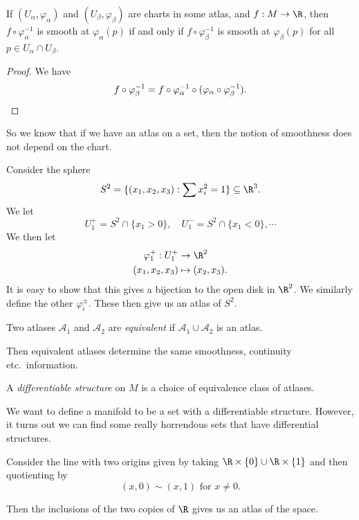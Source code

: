 \documentclass[a4paper]{article}
\begin{document}
\begin{lemma}
  If $(U_\alpha, \varphi_\alpha)$ and $(U_\beta, \varphi_\beta)$ are charts in some atlas, and $f: M \to \R$, then $f \circ \varphi_\alpha^{-1}$ is smooth at $\varphi_\alpha(p)$ if and only if $f \circ \varphi_\beta^{-1}$ is smooth at $\varphi_\beta (p)$ for all $p \in U_\alpha \cap U_\beta$.
\end{lemma}

\begin{proof}
  We have
  \[
    f \circ \varphi_\beta^{-1} = f \circ \varphi_\alpha^{-1} \circ (\varphi_\alpha \circ \varphi_\beta^{-1}). \qedhere
  \]
\end{proof}
So we know that if we have an atlas on a set, then the notion of smoothness does not depend on the chart.

\begin{eg}
  Consider the sphere
  \[
    S^2 = \{(x_1, x_2, x_3): \sum x_i^2 = 1\} \subseteq \R^3.
  \]
  We let
  \[
    U_1^+ = S^2 \cap \{x_1 > 0\},\quad U_1^- = S^2 \cap \{x_1 < 0\}, \cdots
  \]
  We then let
  \begin{align*}
    \varphi_1^+: U_1^+ &\to \R^2\\
    (x_1, x_2, x_3) &\mapsto (x_2, x_3).
  \end{align*}
  It is easy to show that this gives a bijection to the open disk in $\R^2$. We similarly define the other $\varphi_i^{\pm}$. These then give us an atlas of $S^2$.
\end{eg}

\begin{defi}
  Two atlases $\mathcal{A}_1$ and $\mathcal{A}_2$ are \emph{equivalent} if $\mathcal{A}_1 \cup \mathcal{A}_2$ is an atlas.
\end{defi}
Then equivalent atlases determine the same smoothness, continuity etc.\ information.

\begin{defi}
  A \emph{differentiable structure} on $M$ is a choice of equivalence class of atlases.
\end{defi}

We want to define a manifold to be a set with a differentiable structure. However, it turns out we can find some really horrendous sets that have differential structures.

\begin{eg}
  Consider the line with two origins given by taking $\R \times \{0\} \cup \R \times \{1\}$ and then quotienting by
  \[
    (x, 0) \sim (x, 1)\text{ for } x \not= 0.
  \]
  \begin{center}
  \end{center}
  Then the inclusions of the two copies of $\R$ gives us an atlas of the space.
\end{eg}
\end{document}
